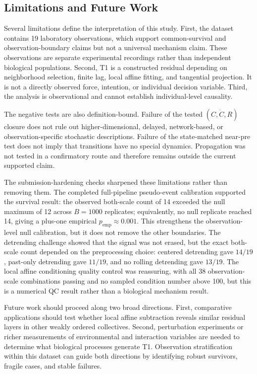 \subsection{Limitations and Future Work}

Several limitations define the interpretation of this study. First, the
dataset contains 19 laboratory observations, which support common-survival and
observation-boundary claims but not a universal mechanism claim. These
observations are separate experimental recordings rather than independent
biological populations. Second, T1 is a constructed residual depending on
neighborhood selection, finite lag, local affine fitting, and tangential
projection. It is not a directly observed force, intention, or individual
decision variable. Third, the analysis is observational and cannot establish
individual-level causality.

The negative tests are also definition-bound. Failure of the tested
$(C,\dot{C},R)$ closure does not rule out higher-dimensional, delayed,
network-based, or observation-specific stochastic descriptions. Failure of the
state-matched near-pre test does not imply that transitions have no special
dynamics. Propagation was not tested in a confirmatory route and therefore
remains outside the current supported claim.

The submission-hardening checks sharpened these limitations rather than
removing them. The completed full-pipeline pseudo-event calibration supported
the survival result: the observed both-scale count of 14 exceeded the null
maximum of 12 across $B=1000$ replicates; equivalently, no null replicate
reached 14, giving a plus-one empirical $p_{\mathrm{emp}}\approx0.001$. This
strengthens the observation-level null calibration, but it
does not remove the other boundaries. The detrending challenge showed that
the signal was not erased, but the exact both-scale count depended on the
preprocessing choice: centered detrending gave $14/19$, past-only detrending
gave $11/19$, and no rolling detrending gave $13/19$. The local affine
conditioning quality control was reassuring, with all 38 observation-scale
combinations passing and no sampled condition number above 100, but this is a
numerical QC result rather than a biological mechanism result.

Future work should proceed along two broad directions. First, comparative
applications should test whether local affine subtraction reveals similar
residual layers in other weakly ordered collectives. Second, perturbation
experiments or richer measurements of environmental and interaction variables
are needed to determine what biological processes generate T1. Observation
stratification within this dataset can guide both directions by identifying
robust survivors, fragile cases, and stable failures.
